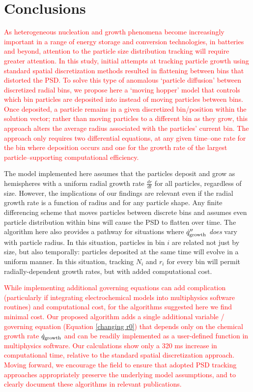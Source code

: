 \documentclass[final,3p,times,twocolumn, 12pt]{elsarticle}
\begin{document}
\section{Conclusions}
 \textcolor{red}{As heterogeneous nucleation and growth phenomena become increasingly important in a range of energy storage and conversion technologies, in batteries and beyond, attention to the particle size distribution tracking will require greater attention. In this study, initial attempts at tracking particle growth using standard spatial discretization methods resulted in flattening between bins that distorted the PSD. To solve this type of anomalous `particle diffusion' between discretized radial bins, we propose here a `moving hopper' model that controls which bin particles are deposited into instead of moving particles between bins. Once deposited, a particle remains in a given discretized bin/position within the solution vector; rather than moving particles to a different bin as they grow, this approach alters the average radius associated with the particles' current bin. The approach only requires two differential equations, at any given time--one rate for the bin where deposition occurs and one for the growth rate of the largest particle--supporting computational efficiency.}
 
 The model implemented here assumes that the particles deposit and grow as hemispheres with a uniform radial growth rate $\frac{dr}{dt}$ for all particles, regardless of size. However, the implications of our findings are relevant even if the radial growth rate is a function of radius and for any particle shape. Any finite differencing scheme that moves particles between discrete bins and assumes even particle distribution within bins will cause the PSD to flatten over time.  The algorithm here also provides a pathway for situations where $\dot{q}^{\prime\prime}_{\rm growth}$ \emph{does} vary with particle radius. In this situation, particles in bin $i$ are related not just by size, but also temporally: particles deposited at the same time will evolve in a uniform manner.  In this situation, tracking $N_i$ and $r_i$ for every bin will permit radially-dependent growth rates, but with added computational cost. 

 \textcolor{red}{While implementing additional governing equations can add complication (particularly if integrating electrochemical models into multiphysics software routines) and computational cost, for the algorithms suggested here we find minimal cost. Our proposed algorithm adds a single additional variable / governing equation (Equation \ref{changing r0}) that depends only on the chemical growth rate $\dot{q}_{\rm growth}$ and can be readily implemented as a user-defined function in multiphysics software. Our calculations show only a 320 ms increase in computational time, relative to the standard spatial discretization approach.  Moving forward, we encourage the field to ensure that adopted PSD tracking approaches appropriately preserve the underlying model assumptions, and to clearly document these algorithms in relevant publications.}
\end{document}
